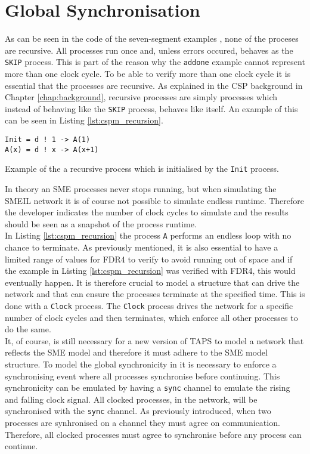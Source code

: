 \section{Global Synchronisation}
As can be seen in the \cspm{} code of the seven-segment examples %
, none of the proceses are recursive. All processes run once and, unless errors occured, behaves as the \texttt{SKIP} process. This is part of the reason why the \texttt{addone} example cannot represent more than one clock cycle. To be able to verify more than one clock cycle it is essential that the processes are recursive. As explained in the CSP background in Chapter \ref{chap:background}, recursive processes are simply processes which instead of behaving like the \texttt{SKIP} process, behaves like itself. An example of this can be seen in Listing \ref{lst:cspm_recursion}.
\begin{listing}
\begin{verbatim}
Init = d ! 1 -> A(1)
A(x) = d ! x -> A(x+1)
\end{verbatim}
\caption{Example of the a recursive \cspm{} process which is initialised by the \texttt{Init} process.}
\label{lst:cspm_recursion}
\end{listing}

In theory an SME processes never stops running, but when simulating the SMEIL network it is of course not possible to simulate endless runtime. Therefore the developer indicates the number of clock cycles to simulate and the results should be seen as a snapshot of the process runtime. \\

In Listing \ref{lst:cspm_recursion} the process \texttt{A} performs an endless loop with no chance to terminate. As previously mentioned, it is also essential to have a limited range of values for FDR4 to verify to avoid running out of space and if the example in Listing \ref{lst:cspm_recursion} was verified with FDR4, this would eventually happen. It is therefore crucial to model a structure that can drive the network and that can ensure the processes terminate at the specified time. This is done with a \texttt{Clock} process. The \texttt{Clock} process drives the network for a specific number of clock cycles and then terminates, which enforce all other processes to do the same. \\
%
It, of course, is still necessary for a new version of TAPS to model a \cspm{} network that reflects the SME model and therefore it must adhere to the SME model structure. To model the global synchronicity in \cspm{} it is necessary to enforce a synchronising event where all processes synchronise before continuing. This synchronicity can be emulated by having a \texttt{sync} channel to emulate the rising and falling clock signal. All clocked processes, in the network, will be synchronised with the \texttt{sync} channel. As previously introduced, when two processes are synhronised on a channel they must agree on communication. Therefore, all clocked processes must agree to synchronise before any process can continue.\\

